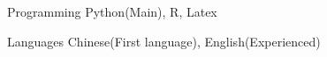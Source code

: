 

\begin{cvskills}




  \cvskill
    {Programming} %
    {Python(Main), R, Latex} %

  \cvskill
    {Languages} %
    {Chinese(First language), English(Experienced)} %

\end{cvskills}
